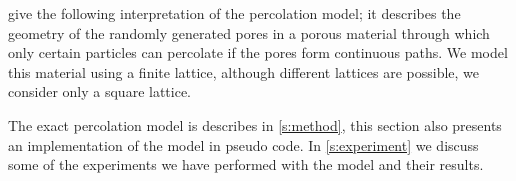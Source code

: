 \noindent \textcite{kenzel1997physics} give the following interpretation of the percolation model; it describes the geometry of the randomly generated pores in a porous material through which only certain particles can percolate if the pores form continuous paths. We model this material using a finite lattice, although different lattices are possible, we consider only a square lattice. 

The exact percolation model is describes in \cref{s:method}, this section also presents an implementation of the model in pseudo code. In \cref{s:experiment} we discuss some of the experiments we have performed with the model and their results. 
